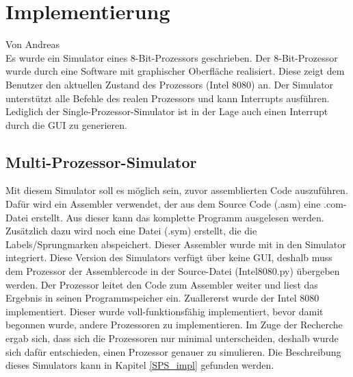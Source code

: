 \documentclass[12pt]{article}
\begin{document}
\newpage

\section{Implementierung}
Von Andreas\\

\noindent
Es wurde ein Simulator eines 8-Bit-Prozessors geschrieben.
Der 8-Bit-Prozessor wurde durch eine Software mit graphischer Oberfläche realisiert. Diese zeigt dem Benutzer den aktuellen Zustand des Prozessors (Intel 8080) an. Der Simulator unterstützt alle Befehle des realen Prozessors und kann Interrupts ausführen. Lediglich der Single-Prozessor-Simulator ist in der Lage auch einen Interrupt durch die GUI zu generieren.


\subsection{Multi-Prozessor-Simulator}
Mit diesem Simulator soll es möglich sein, zuvor assemblierten Code auszuführen. Dafür wird ein Assembler \cite{Assembler} verwendet, der aus dem Source Code (.asm) eine .com-Datei erstellt. Aus dieser kann das komplette Programm ausgelesen werden. Zusätzlich dazu wird noch eine Datei (.sym) erstellt, die die Labels/Sprungmarken abspeichert. Dieser Assembler wurde mit in den Simulator integriert. Diese Version des Simulators verfügt über keine GUI, deshalb muss dem Prozessor der Assemblercode in der Source-Datei (Intel8080.py) übergeben werden. Der Prozessor leitet den Code zum Assembler weiter und liest das Ergebnis in seinen Programmspeicher ein. 
Zuallererst wurde der Intel 8080 implementiert. Dieser wurde voll-funktionsfähig implementiert, bevor damit begonnen wurde, andere Prozessoren zu implementieren. Im Zuge der Recherche ergab sich, dass sich die Prozessoren nur minimal unterscheiden, deshalb wurde sich dafür entschieden, einen Prozessor genauer zu simulieren. Die Beschreibung dieses Simulators kann in Kapitel \ref{SPS_impl} gefunden werden.
\end{document}
